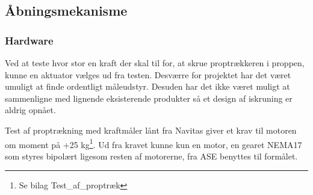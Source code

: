 \subsection{Åbningsmekanisme}
\subsubsection{Hardware}
Ved at teste hvor stor en kraft der skal til for, at skrue proptrækkeren i proppen, kunne en aktuator vælges ud fra testen. Desværre for projektet har det været umuligt at finde ordentligt måleudstyr. Desuden har det ikke været muligt at sammenligne med lignende eksisterende produkter så et design af iskruning er aldrig opnået.

Test af proptrækning med kraftmåler lånt fra Navitas giver et krav til motoren om moment på +25 kg\footnote{Se bilag Test\_af\_proptræk}. Ud fra kravet kunne kun en motor, en gearet NEMA17 som styres bipolært ligesom resten af motorerne, fra ASE benyttes til formålet. 